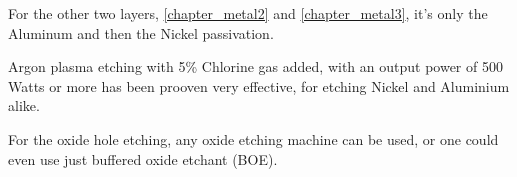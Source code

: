 For the other two layers, \autoref{chapter_metal2} and \autoref{chapter_metal3}, it's only the Aluminum and then the Nickel passivation.

Argon plasma etching with 5\% Chlorine gas added, with an output power of 500 Watts or more has been prooven very effective, for etching Nickel and Aluminium alike.

For the oxide hole etching, any oxide etching machine can be used, or one could even use just buffered oxide etchant (BOE).

\newpage




\newpage




\newpage




\newpage



